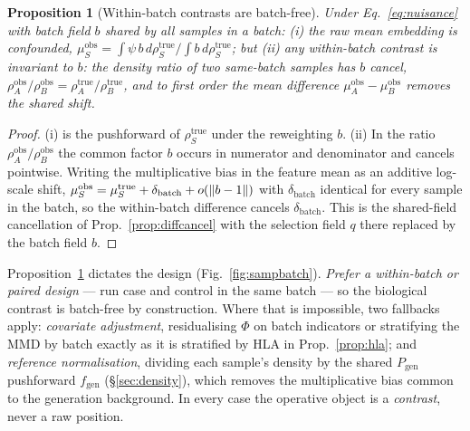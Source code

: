 \documentclass[11pt]{article}
\theoremstyle{oldplain}
\newtheorem{proposition}{Proposition}
\theoremstyle{oldrem}
\newcommand{\Pgen}{P_{\mathrm{gen}}}
\DeclarePairedDelimiter{\norm}{\lVert}{\rVert}
\begin{document}
\begin{proposition}[Within-batch contrasts are batch-free]\label{prop:batch}
Under Eq.~\eqref{eq:nuisance} with batch field $b$ shared by all samples in a batch: \emph{(i)} the raw mean
embedding is confounded, $\mu^{\mathrm{obs}}_S=\int\psi\,b\,d\rho^{\mathrm{true}}_S\big/\!\int
b\,d\rho^{\mathrm{true}}_S$; but \emph{(ii)} any \emph{within-batch contrast} is invariant to $b$: the density
ratio of two same-batch samples has $b$ cancel,
$\rho^{\mathrm{obs}}_A/\rho^{\mathrm{obs}}_B=\rho^{\mathrm{true}}_A/\rho^{\mathrm{true}}_B$, and to first order
the mean difference $\mu^{\mathrm{obs}}_A-\mu^{\mathrm{obs}}_B$ removes the shared shift.
\end{proposition}
\begin{proof}
(i) is the pushforward of $\rho^{\mathrm{true}}_S$ under the reweighting $b$. (ii) In the ratio
$\rho^{\mathrm{obs}}_A/\rho^{\mathrm{obs}}_B$ the common factor $b$ occurs in numerator and denominator and
cancels pointwise. Writing the multiplicative bias in the feature mean as an additive log-scale shift,
$\mu^{\mathrm{obs}}_S=\mu^{\mathrm{true}}_S+\delta_{\mathrm{batch}}+o(\norm{b-1})$ with $\delta_{\mathrm{batch}}$
identical for every sample in the batch, so the within-batch difference cancels $\delta_{\mathrm{batch}}$. This
is the shared-field cancellation of Prop.~\ref{prop:diffcancel} with the selection field $q$ there replaced by
the batch field $b$. \end{proof}

Proposition~\ref{prop:batch} dictates the design (Fig.~\ref{fig:sampbatch}). \emph{Prefer a within-batch or
paired design} --- run case and control in the same batch --- so the biological contrast is batch-free by
construction. Where that is impossible, two fallbacks apply: \emph{covariate adjustment}, residualising $\Phi$
on batch indicators or stratifying the {\scshape MMD} by batch exactly as it is stratified by {\scshape HLA}
in Prop.~\ref{prop:hla}; and \emph{reference normalisation}, dividing each sample's density by the shared
$\Pgen$ pushforward $f_{\mathrm{gen}}$ (\S\ref{sec:density}), which removes the multiplicative bias common to
the generation background. In every case the operative object is a \emph{contrast}, never a raw position.
\end{document}
